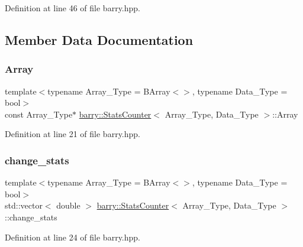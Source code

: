Definition at line 46 of file barry.\+hpp.



\subsection{Member Data Documentation}
\mbox{\label{classbarry_1_1_stats_counter_a4a963a5edf23d0527e1ef87c52c04a97}} 
\subsubsection{\texorpdfstring{Array}{Array}}
{\footnotesize\ttfamily template$<$typename Array\+\_\+\+Type = B\+Array$<$$>$, typename Data\+\_\+\+Type = bool$>$ \\
const Array\+\_\+\+Type$\ast$ \hyperlink{classbarry_1_1_stats_counter}{barry\+::\+Stats\+Counter}$<$ Array\+\_\+\+Type, Data\+\_\+\+Type $>$\+::Array}



Definition at line 21 of file barry.\+hpp.

\mbox{\label{classbarry_1_1_stats_counter_a90b8fddb02b2628cc8d71986f8cdf0ed}} 
\subsubsection{\texorpdfstring{change\+\_\+stats}{change\_stats}}
{\footnotesize\ttfamily template$<$typename Array\+\_\+\+Type = B\+Array$<$$>$, typename Data\+\_\+\+Type = bool$>$ \\
std\+::vector$<$ double $>$ \hyperlink{classbarry_1_1_stats_counter}{barry\+::\+Stats\+Counter}$<$ Array\+\_\+\+Type, Data\+\_\+\+Type $>$\+::change\+\_\+stats}



Definition at line 24 of file barry.\+hpp.

\mbox{\label{classbarry_1_1_stats_counter_a0e9924b44520a91c7384a464fa9711b7}} 
